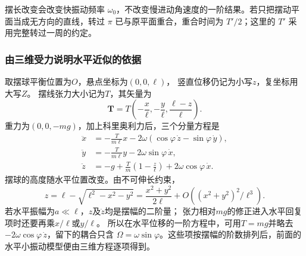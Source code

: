 \documentclass[UTF8,fontset=fandol,a4paper,11pt]{ctexart}
\newcommand{\vect}[1]{\bm{#1}}
\begin{document}
摆长改变会改变快振动频率 $\omega_0$，不改变慢进动角速度的一阶结果。若只把摆动平面当成无方向的直线，转过 $\pi$ 已与原平面重合，重合时间为 $T'/2$；这里的 $T'$ 采用完整转过一周的约定。
\subsubsection*{由三维受力说明水平近似的依据}
取摆球平衡位置为$O$，悬点坐标为$(0,0,\ell)$，
竖直位移仍记为小写$z$，复坐标用大写$Z$。
摆线张力大小记为$T$，其矢量为
\[
\vect T=T\left(-\frac x\ell,-\frac y\ell,\frac{\ell-z}{\ell}\right).
\]
重力为$(0,0,-mg)$，加上科里奥利力后，三个分量方程是
\[
\begin{aligned}
\ddot x&=-\frac{T}{m\ell}x
-2\omega(\cos\varphi\,\dot z-\sin\varphi\,\dot y),\\
\ddot y&=-\frac{T}{m\ell}y-2\omega\sin\varphi\,\dot x,\\
\ddot z&=-g+\frac Tm\left(1-\frac z\ell\right)
+2\omega\cos\varphi\,\dot x.
\end{aligned}
\]
摆球的高度随水平位置改变。由不可伸长约束，
\[
z=\ell-\sqrt{\ell^2-x^2-y^2}
=\frac{x^2+y^2}{2\ell}+O((x^2+y^2)^2/\ell^3).
\]
若水平振幅为$a\ll\ell$，$z$及$\dot z$均是摆幅的二阶量；
张力相对$mg$的修正进入水平回复项时还要再乘$x/\ell$或$y/\ell$。
所以在水平位移的一阶方程中，可用$T=mg$并略去
$-2\omega\cos\varphi\,\dot z$，留下的耦合只含
$\Omega=\omega\sin\varphi$。这些项按摆幅的阶数排列后，前面的水平小振动模型便由三维方程逐项得到。
\end{document}
